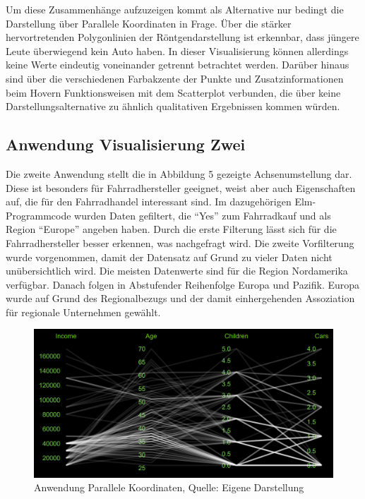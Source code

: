 \documentclass[usegeometry=true]{scrartcl}
\begin{document}
Um diese Zusammenhänge aufzuzeigen kommt als Alternative nur bedingt die Darstellung über Parallele Koordinaten in Frage. Über die stärker hervortretenden Polygonlinien der Röntgendarstellung ist erkennbar, dass jüngere Leute überwiegend kein Auto haben. In dieser Visualisierung können allerdings keine Werte eindeutig voneinander getrennt betrachtet werden. Darüber hinaus sind über die verschiedenen Farbakzente der Punkte und Zusatzinformationen beim Hovern Funktionsweisen mit dem Scatterplot verbunden, die über keine Darstellungsalternative zu ähnlich qualitativen Ergebnissen kommen würden.  

\subsection{Anwendung Visualisierung Zwei}
Die zweite Anwendung stellt die in Abbildung 5 gezeigte Achsenumstellung dar. Diese ist besonders für Fahrradhersteller geeignet, weist aber auch Eigenschaften auf, die für den Fahrradhandel interessant sind. Im dazugehörigen Elm-Programmcode wurden Daten gefiltert, die "`Yes"' zum Fahrradkauf und als Region "`Europe"' angeben haben. Durch die erste Filterung lässt sich für die Fahrradhersteller besser erkennen, was nachgefragt wird. Die zweite Vorfilterung wurde vorgenommen, damit der Datensatz auf Grund zu vieler Daten nicht unübersichtlich wird. Die meisten Datenwerte sind für die Region Nordamerika verfügbar. Danach folgen in Abstufender Reihenfolge Europa und Pazifik. Europa wurde auf Grund des Regionalbezugs und der damit einhergehenden Assoziation für regionale Unternehmen gewählt.
\begin{figure}[h]
\begin{center}
\includegraphics[width=16cm]{Bilder/ParallelCoordsA2.png}
\caption{Anwendung Parallele Koordinaten, Quelle: Eigene Darstellung}
\end{center}
\end{figure}
\end{document}
